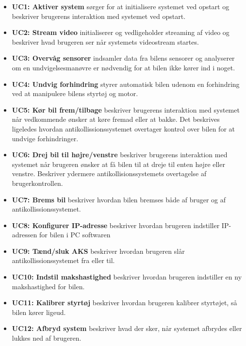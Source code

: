 \begin{itemize}

\item \textbf{UC1: Aktiver system} sørger for at initialisere systemet ved opstart og beskriver brugerens interaktion med systemet ved opstart.

\item \textbf{UC2: Stream video} initialiserer og vedligeholder streaming af video og beskriver hvad brugeren ser når systemets videostream startes.

\item \textbf{UC3: Overvåg sensorer} indsamler data fra bilens sensorer og analyserer om en undvigelsesmanøvre er nødvendig for at bilen ikke kører ind i noget.

\item \textbf{UC4: Undvig forhindring} styrer automatisk bilen udenom en forhindring ved at manipulere bilens styrtøj og motor.

\item \textbf{UC5: Kør bil frem/tilbage} beskriver brugerens interaktion med systemet når vedkommende ønsker at køre fremad eller at bakke. 
Det beskrives ligeledes hvordan antikollissionssystemet overtager kontrol over bilen for at undvige forhindringer.

\item \textbf{UC6: Drej bil til højre/venstre} beskriver brugerens interaktion med systemet når brugeren ønsker at få bilen til at dreje til enten højre eller venstre. Beskriver ydermere antikollisionssystemets overtagelse af brugerkontrollen.

\item \textbf{UC7: Brems bil} beskriver hvordan bilen bremses både af bruger og af antikollissionssystemet.

\item \textbf{UC8: Konfigurer IP-adresse} beskriver hvordan brugeren indstiller IP-adressen for bilen i PC softwaren

\item \textbf{UC9: Tænd/sluk AKS} beskriver hvordan brugeren slår antikollissionssystemet fra eller til.

\item \textbf{UC10: Indstil makshastighed} beskriver hvordan brugeren indstiller en ny makshastighed for bilen.

\item \textbf{UC11: Kalibrer styrtøj} beskriver hvordan brugeren kalibrer styrtøjet, så bilen kører ligeud.

\item \textbf{UC12: Afbryd system} beskriver hvad der sker, når systemet afbrydes eller lukkes ned af brugeren.

\end{itemize}

